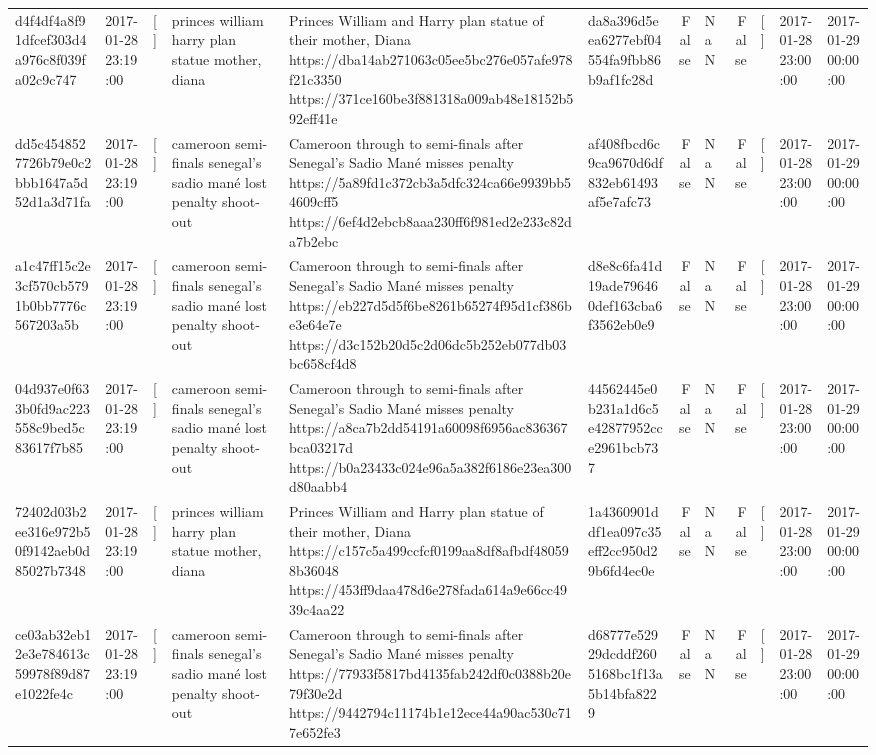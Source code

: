 \begin{tabular}{llllllrlrlll}
d4f4df4a8f91dfcef303d4a976c8f039fa02c9c747 & 2017-01-28 23:19:00 & [] & princes william harry plan statue mother, diana & Princes William and Harry plan statue of their mother, Diana https://dba14ab271063c05ee5bc276e057afe978f21c3350 https://371ce160be3f881318a009ab48e18152b592eff41e & da8a396d5eea6277ebf04554fa9fbb86b9af1fc28d & False & NaN & False & [] & 2017-01-28 23:00:00 & 2017-01-29 00:00:00 \\
dd5c4548527726b79e0c2bbb1647a5d52d1a3d71fa & 2017-01-28 23:19:00 & [] & cameroon semi-finals senegal's sadio mané lost penalty shoot-out & Cameroon through to semi-finals after Senegal’s Sadio Mané misses penalty https://5a89fd1c372cb3a5dfc324ca66e9939bb54609cff5 https://6ef4d2ebcb8aaa230ff6f981ed2e233c82da7b2ebc & af408fbcd6c9ca9670d6df832eb61493af5e7afc73 & False & NaN & False & [] & 2017-01-28 23:00:00 & 2017-01-29 00:00:00 \\
a1c47ff15c2e3cf570cb5791b0bb7776c567203a5b & 2017-01-28 23:19:00 & [] & cameroon semi-finals senegal's sadio mané lost penalty shoot-out & Cameroon through to semi-finals after Senegal’s Sadio Mané misses penalty https://eb227d5d5f6be8261b65274f95d1cf386be3e64e7e https://d3c152b20d5c2d06dc5b252eb077db03bc658cf4d8 & d8e8c6fa41d19ade796460def163cba6f3562eb0e9 & False & NaN & False & [] & 2017-01-28 23:00:00 & 2017-01-29 00:00:00 \\
04d937e0f633b0fd9ac223558c9bed5c83617f7b85 & 2017-01-28 23:19:00 & [] & cameroon semi-finals senegal's sadio mané lost penalty shoot-out & Cameroon through to semi-finals after Senegal’s Sadio Mané misses penalty https://a8ca7b2dd54191a60098f6956ac836367bca03217d https://b0a23433c024e96a5a382f6186e23ea300d80aabb4 & 44562445e0b231a1d6c5e42877952cce2961bcb737 & False & NaN & False & [] & 2017-01-28 23:00:00 & 2017-01-29 00:00:00 \\
72402d03b2ee316e972b50f9142aeb0d85027b7348 & 2017-01-28 23:19:00 & [] & princes william harry plan statue mother, diana & Princes William and Harry plan statue of their mother, Diana https://c157c5a499ccfcf0199aa8df8afbdf480598b36048 https://453ff9daa478d6e278fada614a9e66cc4939c4aa22 & 1a4360901ddf1ea097c35eff2cc950d29b6fd4ec0e & False & NaN & False & [] & 2017-01-28 23:00:00 & 2017-01-29 00:00:00 \\
ce03ab32eb12e3e784613c59978f89d87e1022fe4c & 2017-01-28 23:19:00 & [] & cameroon semi-finals senegal's sadio mané lost penalty shoot-out & Cameroon through to semi-finals after Senegal’s Sadio Mané misses penalty https://77933f5817bd4135fab242df0c0388b20e79f30e2d https://9442794c11174b1e12ece44a90ac530c717e652fe3 & d68777e52929dcddf2605168bc1f13a5b14bfa8229 & False & NaN & False & [] & 2017-01-28 23:00:00 & 2017-01-29 00:00:00 \\

\end{tabular}
